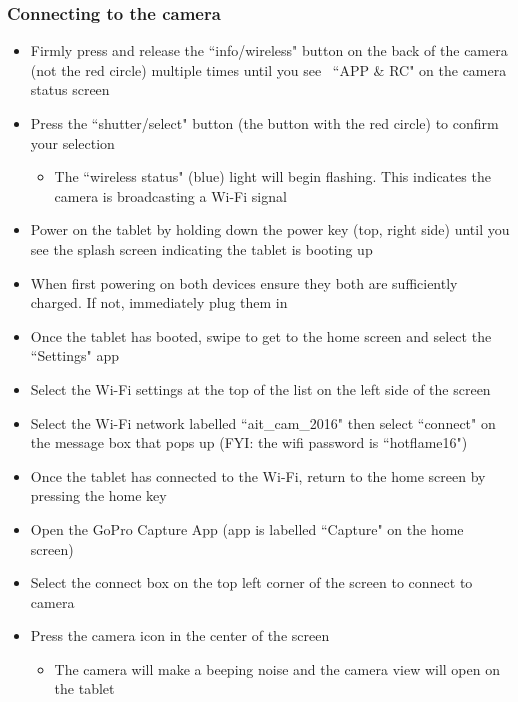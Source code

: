 \documentclass[letterpaper,11pt]{article}
\begin{document}
       
    \subsubsection{Connecting to the camera} 
        \begin{itemize}
        \item Firmly press and release the ``info/wireless" button on the back of
            the camera (not the red circle) multiple times until you see \
            ``APP \& RC" on the camera status screen
        \item Press the ``shutter/select" button (the button with the red 
            circle) to confirm your selection
            \begin{itemize}
            \item The ``wireless status" (blue) light will begin flashing. This 
                indicates the camera is broadcasting a Wi-Fi signal 
            \end{itemize}
        \item Power on the tablet by holding down the power key (top, right side) until you see the
            splash screen indicating the tablet is booting up
        \item When first powering on both devices ensure they both are 
            sufficiently charged. If not, immediately plug them in
        \item Once the tablet has booted, swipe to get to the home screen and 
            select the ``Settings" app
        \item Select the Wi-Fi settings at the top of the list on the left side 
            of the screen
        \item Select the Wi-Fi network labelled ``ait\_cam\_2016" then select 
            ``connect" on the message box that pops up (FYI: the wifi password is
            ``hotflame16")
        \item Once the tablet has connected to the Wi-Fi, return to the home 
            screen by pressing the home key
        \item Open the GoPro Capture App (app is labelled ``Capture" on the home 
            screen) 
        \item Select the connect box on the top left corner of the screen to connect to camera
        \item Press the camera icon in the center of the screen
            \begin{itemize}
            \item The camera will make a beeping noise and the camera view will 
                open on the tablet
            \end{itemize}
        \end{itemize}
    
\end{document}
